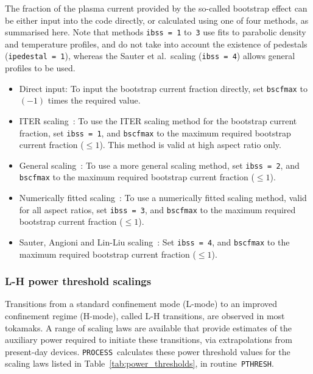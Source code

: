 \documentclass[11pt,a4paper]{report}
\newcommand{\process}{\mbox{\texttt{PROCESS}}}
\begin{document}
The fraction of the plasma current provided by the so-called bootstrap effect
can be either input into the code directly, or calculated using one of four
methods, as summarised here. Note that methods \texttt{ibss = 1} to~\texttt{3}
use fits to parabolic density and temperature profiles, and do not take into
account the existence of pedestals (\texttt{ipedestal = 1}), whereas the
Sauter et al.\ scaling (\texttt{ibss = 4}) allows general profiles to be used.
\begin{itemize}

\item Direct input: To input the bootstrap current fraction directly, set
  \texttt{bscfmax} to $(-1)$ times the required value.

\item ITER scaling~\cite{IPDG}: To use the ITER scaling method for the
  bootstrap current fraction, set \texttt{ibss = 1}, and \texttt{bscfmax} to
  the maximum required bootstrap current fraction ($\leq 1$). This method is
  valid at high aspect ratio only.

\item General scaling~\cite{Nevins}: To use a more general scaling method, set
  \texttt{ibss = 2}, and \texttt{bscfmax} to the maximum required bootstrap
  current fraction ($\leq 1$).

\item Numerically fitted scaling~\cite{WilsonBS}: To use a numerically fitted
  scaling method, valid for all aspect ratios, set \texttt{ibss = 3}, and
  \texttt{bscfmax} to the maximum required bootstrap current fraction ($\leq
  1$).

\item Sauter, Angioni and Lin-Liu scaling~\cite{SauterBS, SauterBS_errata}:
  Set \texttt{ibss = 4}, and \texttt{bscfmax} to the maximum required
  bootstrap current fraction ($\leq 1$).

\end{itemize}

\subsubsection{L-H power threshold scalings}

Transitions from a standard confinement mode (L-mode) to an improved
confinement regime (H-mode), called L-H transitions, are observed in most
tokamaks. A range of scaling laws are available that provide estimates of the
auxiliary power required to initiate these transitions, via extrapolations
from present-day devices. \process\ calculates these power threshold values
for the scaling laws listed in Table~\ref{tab:power_thresholds}, in
routine~\texttt{PTHRESH}.
\end{document}
